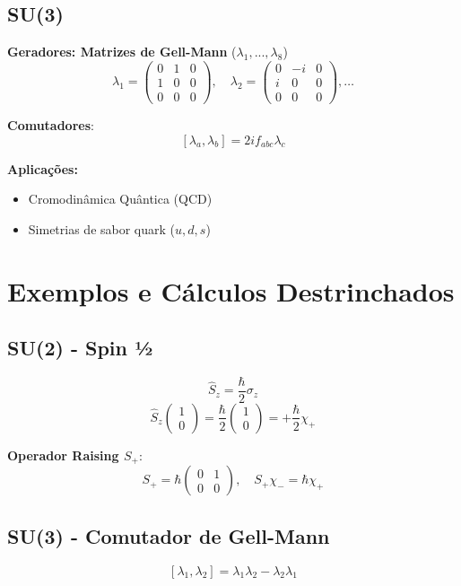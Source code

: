 \documentclass[12pt,a4paper]{article}
\begin{document}
\subsection{SU(3)}
\textbf{Geradores: Matrizes de Gell-Mann} ($\lambda_1, ..., \lambda_8$)
\[
\lambda_1 = 
\begin{pmatrix} 0 & 1 & 0\\ 1 & 0 & 0\\ 0 & 0 & 0 \end{pmatrix}, \quad
\lambda_2 = 
\begin{pmatrix} 0 & -i & 0\\ i & 0 & 0\\ 0 & 0 & 0 \end{pmatrix}, \dots
\]

\textbf{Comutadores}:
\[
[\lambda_a, \lambda_b] = 2 i f_{abc} \lambda_c
\]

\textbf{Aplicações:}
\begin{itemize}
    \item Cromodinâmica Quântica (QCD)
    \item Simetrias de sabor quark ($u,d,s$)
\end{itemize}

\section{Exemplos e Cálculos Destrinchados}

\subsection{SU(2) - Spin ½}
\[
\hat{S}_z = \frac{\hbar}{2} \sigma_z
\]
\[
\hat{S}_z \begin{pmatrix}1\\0\end{pmatrix} = \frac{\hbar}{2} \begin{pmatrix}1\\0\end{pmatrix} = +\frac{\hbar}{2} \chi_+
\]

\textbf{Operador Raising $S_+$}:
\[
S_+ = \hbar \begin{pmatrix}0 & 1\\0 & 0\end{pmatrix}, \quad
S_+ \chi_- = \hbar \chi_+
\]

\subsection{SU(3) - Comutador de Gell-Mann}
\[
[\lambda_1, \lambda_2] = \lambda_1 \lambda_2 - \lambda_2 \lambda_1
\]
\end{document}
